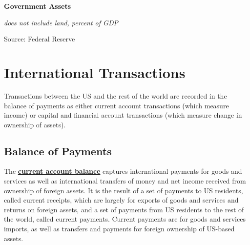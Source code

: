 \documentclass{report}
\makeatletter
\newcommand{\tbllink}[1]{\href{https://raw.githubusercontent.com/bdecon/US-chartbook/master/chartbook/data/#1}{\faTable}}
\newcommand*\short[1]{\expandafter\@gobbletwo\number\numexpr#1\relax}
\newcommand{\sbar}[4]{
		\addplot[ybar stacked, bar width=2.6pt, draw opacity=0, fill=#1] 
			table [x=#2, y=#3, col sep=comma]{#4};}
\newcommand{\dateaxisticks}{
		date coordinates in=x, axis line style={draw=none},
		xmax={2020-10-01},
		max space between ticks=40,	    
		xtick={{1990-01-01}, {1992-01-01}, {1994-01-01}, 
			{1996-01-01}, {1998-01-01}, {2000-01-01}, 
			{2002-01-01}, {2004-01-01}, {2006-01-01},
			{2008-01-01}, {2010-01-01}, {2012-01-01}, {2014-01-01},
		    {2016-01-01}, {2018-01-01}, {2020-01-01}},
		minor xtick={{1989-01-01}, {1991-01-01}, {1993-01-01},
			{1995-01-01}, {1997-01-01}, {1999-01-01}, 
			{2001-01-01}, {2003-01-01}, {2005-01-01}, {2007-01-01},
		    {2009-01-01}, {2011-01-01}, {2013-01-01}, {2015-01-01},
		    {2017-01-01}, {2019-01-01}},
		enlarge y limits={0.06}, enlarge x limits={0.01},
		}
\newcommand{\bbar}[2]{extra #1 ticks = {{#2}}, extra #1 tick labels = ,
		extra #1 tick style = {grid=major, grid style={thick, black!25}},}
\newcommand{\rbars}{
		\fill[color=black!10] (axis cs:{1990-07-01},\pgfkeysvalueof{/pgfplots/ymin}) rectangle 
			(axis cs:{1991-03-01}, \pgfkeysvalueof{/pgfplots/ymax});
		\fill[color=black!10] (axis cs:{2007-12-01},\pgfkeysvalueof{/pgfplots/ymin}) rectangle 
			(axis cs:{2009-07-01}, \pgfkeysvalueof{/pgfplots/ymax});
		\fill[color=black!10] (axis cs:{2001-03-01},\pgfkeysvalueof{/pgfplots/ymin}) rectangle 
			(axis cs:{2001-11-01}, \pgfkeysvalueof{/pgfplots/ymax});
		\fill[color=black!10] (axis cs:{2020-02-01},\pgfkeysvalueof{/pgfplots/ymin}) rectangle 
			(axis cs:{2020-10-01}, \pgfkeysvalueof{/pgfplots/ymax});}
\makeatother
\begin{document}
{{{{{\begin{minipage}{0.76\textwidth}


\vspace{4mm}

\normalsize \textbf{Government Assets}

\footnotesize{\textit{does not include land, percent of GDP}}

\hspace*{-2mm} 

\footnotesize{Source: Federal Reserve} \hfill \tbllink{govassets.csv}
\end{minipage}

\newpage
\begin{minipage}{0.76\textwidth}
\section*{\color{darkgray}\LARGE International Transactions}
\label{sec:ext}
\small Transactions between the US and the rest of the world are recorded in the balance of payments as either current account transactions (which measure income) or capital and financial account transactions (which measure change in ownership of assets). 

\subsection*{\color{black!70} \seriffont Balance of Payments}
\small The \textbf{\href{https://www.bea.gov/help/glossary/balance-current-account-national-income-and-product-accounts}{current account balance}} captures international payments for goods and services as well as international transfers of money and net income received from ownership of foreign assets. It is the result of a set of payments to US residents, called current receipts, which are largely for exports of goods and services and returns on foreign assets, and a set of payments from US residents to the rest of the world, called current payments. Current payments are for goods and services imports, as well as transfers and payments for foreign ownership of US-based assets.\\


\end{minipage}}}}}}
\end{document}
